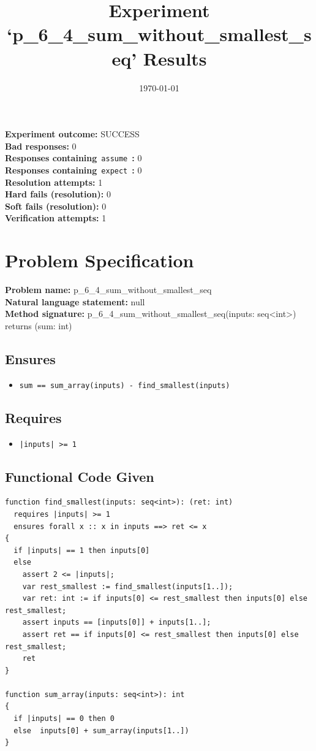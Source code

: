 \documentclass{article}
\begin{document}
\title{Experiment `p\_6\_4\_sum\_without\_smallest\_seq' Results}
\author{\today}
\date{}
\maketitle
\textbf{Experiment outcome: }SUCCESS
\\\textbf{Bad responses: }0
\\\textbf{Responses containing}~\texttt{assume}~\textbf{: }0
\\\textbf{Responses containing}~\texttt{expect}~\textbf{: }0
\\\textbf{Resolution attempts: }1
\\\textbf{Hard fails (resolution): }0
\\\textbf{Soft fails (resolution): }0
\\\textbf{Verification attempts: }1
\section*{Problem Specification}
\textbf{Problem name: }p\_6\_4\_sum\_without\_smallest\_seq
\\\textbf{Natural language statement: }null
\\\textbf{Method signature: }p\_6\_4\_sum\_without\_smallest\_seq(inputs: seq<int>) returns (sum: int)
\subsection*{Ensures}
\begin{itemize}
\item \texttt{sum == sum\_array(inputs) - find\_smallest(inputs)}
\end{itemize}
\subsection*{Requires}
\begin{itemize}
\item \texttt{|inputs| >= 1}
\end{itemize}
\subsection*{Functional Code Given}
\begin{lstlisting}
function find_smallest(inputs: seq<int>): (ret: int)
  requires |inputs| >= 1
  ensures forall x :: x in inputs ==> ret <= x 
{
  if |inputs| == 1 then inputs[0]
  else 
    assert 2 <= |inputs|;
    var rest_smallest := find_smallest(inputs[1..]);
    var ret: int := if inputs[0] <= rest_smallest then inputs[0] else rest_smallest;
    assert inputs == [inputs[0]] + inputs[1..]; 
    assert ret == if inputs[0] <= rest_smallest then inputs[0] else rest_smallest;
    ret 
}

function sum_array(inputs: seq<int>): int
{
  if |inputs| == 0 then 0
  else  inputs[0] + sum_array(inputs[1..])
}
\end{lstlisting}
\clearpage
\end{document}
